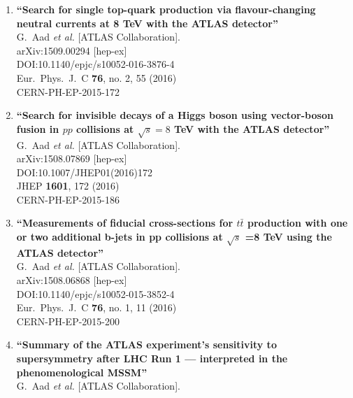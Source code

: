 \documentclass{article}
\begin{document}
\begin{enumerate}
\item%
{\bf ``Search for single top-quark production via flavour-changing neutral currents at 8 TeV with the ATLAS detector''}
  \\{}G.~Aad {\it et al.} [ATLAS Collaboration].
  \\{}arXiv:1509.00294 [hep-ex]
  \\{}DOI:10.1140/epjc/s10052-016-3876-4
  \\{}Eur.\ Phys.\ J.\ C {\bf 76}, no. 2, 55 (2016)
  \\{}CERN-PH-EP-2015-172
\item%
{\bf ``Search for invisible decays of a Higgs boson using vector-boson fusion in $pp$ collisions at $\sqrt{s}=8$ TeV with the ATLAS detector''}
  \\{}G.~Aad {\it et al.} [ATLAS Collaboration].
  \\{}arXiv:1508.07869 [hep-ex]
  \\{}DOI:10.1007/JHEP01(2016)172
  \\{}JHEP {\bf 1601}, 172 (2016)
  \\{}CERN-PH-EP-2015-186
\item%
{\bf ``Measurements of fiducial cross-sections for $t\bar{t}$ production with one or two additional b-jets in pp collisions at $\sqrt{s}$ =8 TeV using the ATLAS detector''}
  \\{}G.~Aad {\it et al.} [ATLAS Collaboration].
  \\{}arXiv:1508.06868 [hep-ex]
  \\{}DOI:10.1140/epjc/s10052-015-3852-4
  \\{}Eur.\ Phys.\ J.\ C {\bf 76}, no. 1, 11 (2016)
  \\{}CERN-PH-EP-2015-200
\item%
{\bf ``Summary of the ATLAS experiment’s sensitivity to supersymmetry after LHC Run 1 — interpreted in the phenomenological MSSM''}
  \\{}G.~Aad {\it et al.} [ATLAS Collaboration].

\end{enumerate}
\end{document}
